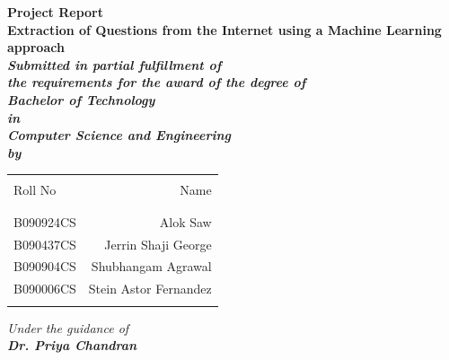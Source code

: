 \pagestyle{headings}%
\thispagestyle{empty}%
\begin{center}%
	\Large\bf{Project Report}\\%
	\vspace{0.5cm}%
	\huge\bf{Extraction of Questions from the Internet using a Machine Learning approach}\\%
               \vspace{1cm}%
	\small\it{Submitted in partial fulfillment of}\\%
	\small\it{the requirements for the award of the degree of}\\%
	\vspace{0.5cm}%
	\large\bf\it{Bachelor of Technology}\\%
	\small\it{in}\\%
	\large\it{Computer Science and Engineering}\\%
	\vspace{0.5cm}%
	\Large\it {by}\\%
	\vspace{0.3cm}%
	\begin{table}[h]
		\centering
		\begin{tabular}{lr}\hline \\
			Roll No & Name \\ \\ \hline
			\\
            B090924CS & Alok Saw \\ 
            B090437CS & Jerrin Shaji George \\ 
            B090904CS & Shubhangam Agrawal \\ 
            B090006CS & Stein Astor Fernandez \\ \\ \hline 
		\end{tabular}
	\end{table}
	\Large\it {Under the guidance of}\\%
	\normalfont\bf{Dr. Priya Chandran}\\%
	\begin{figure}[!ht]
		\begin{center}

\end{center}
\end{figure}
\end{center}
